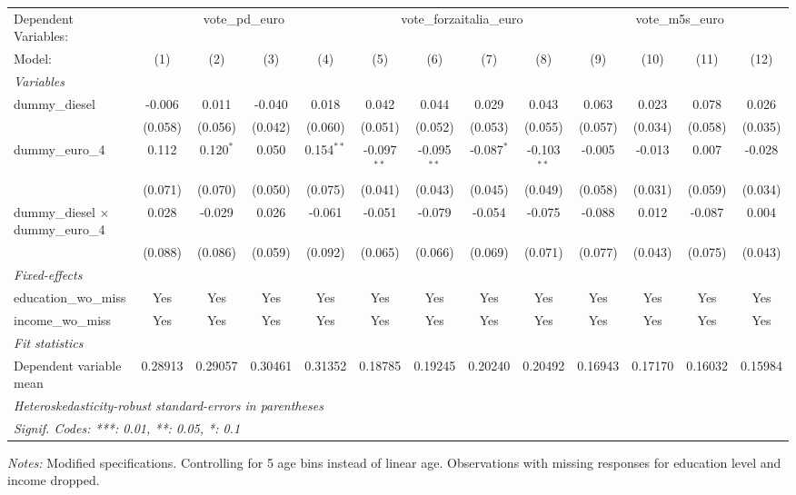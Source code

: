 
\begingroup
\centering
\begin{tabular}{lcccccccccccc}
   \tabularnewline \midrule \midrule
   Dependent Variables: & \multicolumn{4}{c}{vote\_pd\_euro} & \multicolumn{4}{c}{vote\_forzaitalia\_euro} & \multicolumn{4}{c}{vote\_m5s\_euro}\\
   Model:                                    & (1)     & (2)         & (3)     & (4)          & (5)           & (6)           & (7)          & (8)           & (9)     & (10)    & (11)    & (12)\\  
   \midrule
   \emph{Variables}\\
   dummy\_diesel                             & -0.006  & 0.011       & -0.040  & 0.018        & 0.042         & 0.044         & 0.029        & 0.043         & 0.063   & 0.023   & 0.078   & 0.026\\   
                                             & (0.058) & (0.056)     & (0.042) & (0.060)      & (0.051)       & (0.052)       & (0.053)      & (0.055)       & (0.057) & (0.034) & (0.058) & (0.035)\\   
   dummy\_euro\_4                            & 0.112   & 0.120$^{*}$ & 0.050   & 0.154$^{**}$ & -0.097$^{**}$ & -0.095$^{**}$ & -0.087$^{*}$ & -0.103$^{**}$ & -0.005  & -0.013  & 0.007   & -0.028\\   
                                             & (0.071) & (0.070)     & (0.050) & (0.075)      & (0.041)       & (0.043)       & (0.045)      & (0.049)       & (0.058) & (0.031) & (0.059) & (0.034)\\   
   dummy\_diesel $\times$ dummy\_euro\_4     & 0.028   & -0.029      & 0.026   & -0.061       & -0.051        & -0.079        & -0.054       & -0.075        & -0.088  & 0.012   & -0.087  & 0.004\\   
                                             & (0.088) & (0.086)     & (0.059) & (0.092)      & (0.065)       & (0.066)       & (0.069)      & (0.071)       & (0.077) & (0.043) & (0.075) & (0.043)\\   
   \midrule
   \emph{Fixed-effects}\\
   education\_wo\_miss                       & Yes     & Yes         & Yes     & Yes          & Yes           & Yes           & Yes          & Yes           & Yes     & Yes     & Yes     & Yes\\  
   income\_wo\_miss                          & Yes     & Yes         & Yes     & Yes          & Yes           & Yes           & Yes          & Yes           & Yes     & Yes     & Yes     & Yes\\  
   \midrule
   \emph{Fit statistics}\\
   Dependent variable mean                   & 0.28913 & 0.29057     & 0.30461 & 0.31352      & 0.18785       & 0.19245       & 0.20240      & 0.20492       & 0.16943 & 0.17170 & 0.16032 & 0.15984\\  
   \midrule \midrule
   \multicolumn{13}{l}{\emph{Heteroskedasticity-robust standard-errors in parentheses}}\\
   \multicolumn{13}{l}{\emph{Signif. Codes: ***: 0.01, **: 0.05, *: 0.1}}\\
\end{tabular}
 
\par \raggedright 
\textit{Notes:} Modified specifications. Controlling for 5 age bins instead of linear age. Observations with missing responses for education level and income dropped.
\par\endgroup


